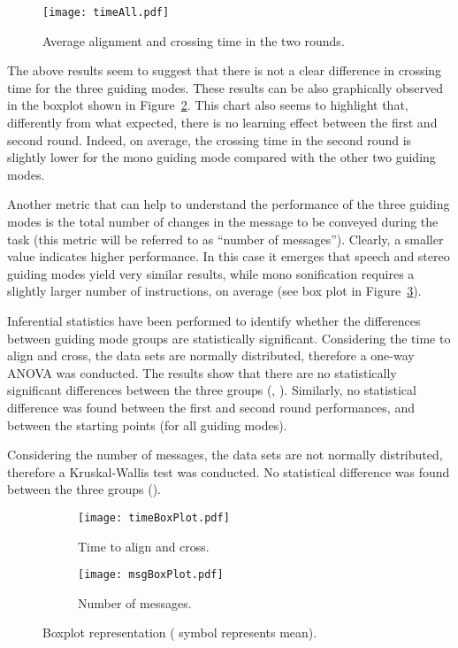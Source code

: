 \documentclass{article}
\begin{document}
\begin{figure}[t!]
	\centering
		\texttt{[image: timeAll.pdf]}
	\caption[]{Average alignment and crossing time in the two rounds.}
	\label{fig:timeAll}
\end{figure}

The above results seem to suggest that there is not a clear difference in crossing time for the three guiding modes. These results can be also graphically observed in the boxplot shown in Figure~\ref{fig:timeBoxPlot}.
This chart also seems to highlight that, differently from what expected, there is no learning effect between the first and second round. Indeed, on average, the crossing time in the second round is slightly lower for the mono guiding mode compared with the other two guiding modes.

Another metric that can help to understand the performance of the three guiding modes is the total number of changes in the message to be conveyed during the task (this metric will be referred to as ``number of messages''). Clearly, a smaller value indicates higher performance.
In this case it emerges that speech and stereo guiding modes yield very similar results, while mono sonification requires a slightly larger number of instructions, on average (see box plot in Figure~\ref{fig:msgBoxPlot}).

Inferential statistics have been performed to identify whether the differences between guiding mode groups are statistically significant.
Considering the time to align and cross, the data sets are normally distributed, therefore a one-way ANOVA was conducted. The results show that there are no statistically significant differences between the three groups (, ).
Similarly, no statistical difference was found between the first and second round performances, and between the starting points (for all guiding modes).

Considering the number of messages, the data sets are not normally distributed, therefore a Kruskal-Wallis test was conducted. No statistical difference was found between the three groups ().

\begin{figure}[t!]
        \centering
        \begin{subfigure}[b]{.5\textwidth}
                \texttt{[image: timeBoxPlot.pdf]}
                \caption{Time to align and cross.}
                \label{fig:timeBoxPlot}
        \end{subfigure}\begin{subfigure}[b]{.5\textwidth}
                \texttt{[image: msgBoxPlot.pdf]}
                \caption{Number of messages.}
                \label{fig:msgBoxPlot}
        \end{subfigure}
        \caption{Boxplot representation ( symbol represents mean).}
        \label{fig:quali}
\end{figure}
\end{document}
